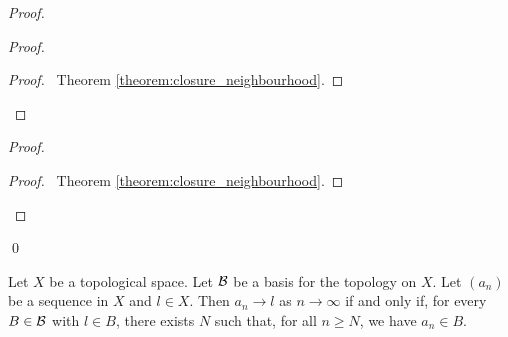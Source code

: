 \begin{proof}
    \pf
    \begin{proof}
        \begin{proof}
            \pf\ Theorem \ref{theorem:closure_neighbourhood}.
        \end{proof}
    \end{proof}
    \begin{proof}
        \qedstep
        \begin{proof}
            \pf\ Theorem \ref{theorem:closure_neighbourhood}.
        \end{proof}
    \end{proof}
    \qed
\end{proof}

\begin{proposition}
    \label{proposition:convergence_basis}
    Let $X$ be a topological space. Let $\mathcal{B}$ be a basis for the topology on $X$.
    Let $(a_n)$ be a sequence in $X$ and $l \in X$. Then $a_n \rightarrow l$ as
    $n \rightarrow \infty$ if and only if, for every $B \in \mathcal{B}$ with $l \in B$,
    there exists $N$ such that, for all $n \geq N$, we have $a_n \in B$.
\end{proposition}

